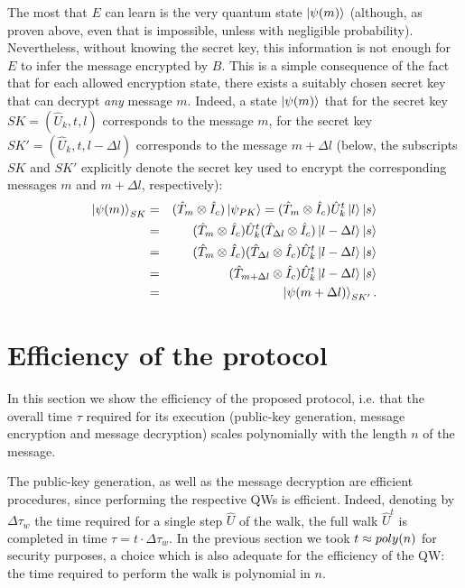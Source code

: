 The most that $E$ can learn is the very quantum state $\Ket{\psi(m)}$ (although, as proven above, even that is impossible, unless with negligible probability). Nevertheless, without knowing the secret key, this information is not enough for $E$ to infer the message encrypted by $B$. This is a simple consequence of the fact that for each allowed encryption state, there exists a suitably chosen secret key that can decrypt {\em any} message $m$. Indeed, a state $\Ket{\psi(m)}$ that for the secret key $SK = (\hat U_k, t, l)$ corresponds to the message $m$, for the secret key $SK' = (\hat U_k, t, l - \Delta l)$ corresponds to the message $m + \Delta l$ (below, the subscripts $SK$ and $SK'$ explicitly denote the secret key used to encrypt the corresponding messages $m$ and $m + \Delta l$, respectively):
\begin{eqnarray}
\Ket{\psi(m)}_{SK} 	& = & (\hat{T}_m\otimes \hat{I}_c) \Ket{\psi_{PK}}
=  (\hat{T}_{m}\otimes \hat{I}_c) \hat{U}_k^t  \Ket{l}\Ket{s} \nonumber \\
			& = & (\hat{T}_{m}\otimes \hat{I}_c) \hat{U}_k^t  (\hat{T}_{\Delta l}\otimes \hat{I}_c)\Ket{l - \Delta l}\Ket{s}\nonumber \\
			& = & (\hat{T}_{m}\otimes \hat{I}_c) (\hat{T}_{\Delta l}\otimes \hat{I}_c) \hat{U}_k^t  \Ket{l - \Delta l}\Ket{s}\nonumber \\
			& = & (\hat{T}_{m + \Delta l}\otimes \hat{I}_c) \hat{U}_k^t  \Ket{l - \Delta l}\Ket{s} \nonumber \\
			& = & \Ket{\psi(m + \Delta l)}_{SK'}. \end{eqnarray}



\section{Efficiency of the protocol}
\label{sec:effpk}
In this section we show the efficiency of the proposed protocol, i.e. that the overall time $\tau$ required for its execution (public-key generation, message encryption and message decryption) scales polynomially with the length $n$ of the message. 

The public-key generation, as well as the message decryption are efficient procedures, since performing the respective QWs is efficient.
Indeed, denoting by $\Delta\tau_w$ the time required for a single step $\hat U$ of the walk, the full walk $\hat U^t$ is completed in time $\tau=t\cdot\Delta\tau_w$. In the previous section we took $t \approx poly(n)$ for security purposes, a choice which is also adequate for the efficiency of the QW: the time required to perform the walk is polynomial in $n$.

